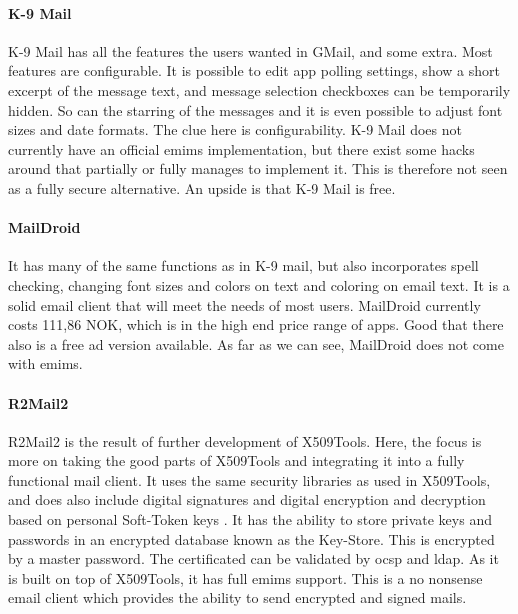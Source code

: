 \paragraph{K-9 Mail} \hfill
\newline
K-9 Mail has all the features the users wanted in GMail, and some extra. Most features are configurable. It is possible to edit app polling settings, show a short excerpt of the message text, and message selection checkboxes can be temporarily hidden. So can the starring of the messages and it is even possible to adjust font sizes and date formats. The clue here is configurability. K-9 Mail does not currently have an official \gls{emims} implementation, but there exist some hacks around that partially or fully manages to implement it. This is therefore not seen as a fully secure alternative. An upside is that K-9 Mail is free.

\paragraph{MailDroid} \hfill
\newline
It has many of the same functions as in K-9 mail, but also incorporates spell checking, changing font sizes and colors on text and coloring on email text. It is a solid email client that will meet the needs of most users. MailDroid currently costs 111,86 NOK, which is in the high end price range of apps. Good that there also is a free ad version available. As far as we can see, MailDroid does not come with \gls{emims}. 

\paragraph{R2Mail2} \hfill
\newline
R2Mail2 is the result of further development of X509Tools. Here, the focus is more on taking the good parts of X509Tools and integrating it into a fully functional mail client. It uses the same security libraries as used in X509Tools, and does also include digital signatures and digital encryption and decryption based on personal Soft-Token keys \cite{bib:r2mail2}. It has the ability to store private keys and passwords in an encrypted database known as the Key-Store. This is encrypted by a master password. The certificated can be validated by \gls{ocsp} and \gls{ldap}. As it is built on top of X509Tools, it has full \gls{emims} support. This is a no nonsense email client which provides the ability to send encrypted and signed mails.

